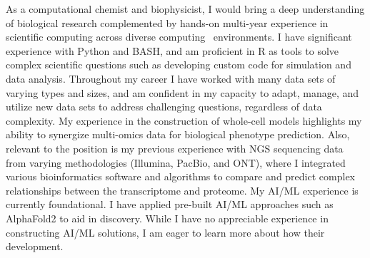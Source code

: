 \documentclass[11pt, a4paper]{awesome-cv}
\newcommand{\companyname}{Quest Dianostics}
\newcommand{\role}{Senior Bioinformatics Engineer}
\newcommand{\brole}{\textbf{\role}}
\begin{document}
\begin{cvletter}
		As a computational chemist and biophysicist, I would bring a deep understanding of biological research complemented by hands-on multi-year experience in scientific computing across diverse computing%
		~environments. %
		I have significant experience with Python and BASH, and am proficient in R as tools to solve complex scientific questions such as developing custom code for simulation and data analysis.
		Throughout my career I have worked with many data sets of varying types and sizes, and am confident in my capacity to adapt, manage, and utilize new data sets to address challenging questions, regardless of data complexity. 
		My experience in the construction of whole-cell models highlights my ability to synergize multi-omics data for biological phenotype prediction. 
		Also, relevant to the position is my previous experience with NGS sequencing data from varying methodologies (Illumina, PacBio, and ONT), where I integrated various bioinformatics software and algorithms to compare and predict complex relationships between the transcriptome and proteome. 
		My AI/ML experience is currently foundational. I have applied pre-built AI/ML approaches such as AlphaFold2 to aid in discovery. While I have no appreciable experience in constructing AI/ML solutions, I am eager to learn more about how their development.%

\end{cvletter}
\end{document}
